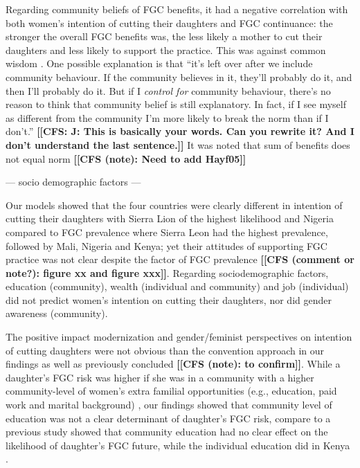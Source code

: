 \documentclass[12pt,]{article}
\newcommand{\comment}[1]{\textbf{[[#1]]}}
\newcommand{\cfcmt}[1]{\comment{CFS: #1}}
\newcommand{\cfonly}[1]{\comment{CFS (note): #1}}
\newcommand{\cf}[1]{\comment{CFS (comment or note?): #1}}
\begin{document}
Regarding community beliefs of FGC benefits, it had a negative correlation with both women’s intention of cutting their daughters and FGC continuance:  the stronger the overall FGC benefits was, the less likely a mother to cut their daughters and less likely to support the practice.  This was against common wisdom \cite{}.  One possible explanation is that “it's left over after we include community behaviour. If the community believes in it, they'll probably do it, and then I'll probably do it. But if I \emph{control for} community behaviour, there's no reason to think that community belief is still explanatory. In fact, if I see myself as different from the community I'm more likely to break the norm than if I don’t.” \cfcmt{J:  This is basically your words.  Can you rewrite it?  And I don’t understand the last sentence.}  It was noted that sum of benefits does not equal norm \cite{RimaLapi15}  \cfonly{Need to add Hayf05}

— socio demographic factors —

Our models showed that the four countries were clearly different in intention of cutting their daughters with Sierra Lion of the highest likelihood and Nigeria compared to FGC prevalence where Sierra Leon had the highest prevalence, followed by Mali, Nigeria and Kenya; yet their attitudes of supporting FGC practice was not clear despite the factor of FGC prevalence \cf{figure xx and figure xxx}.  Regarding sociodemographic factors, education (community), wealth (individual and community) and job (individual) did not predict women’s intention on cutting their daughters, nor did gender awareness (community). 

The positive impact modernization \cite{BoylMcMo02, Youn02} and gender/feminist perspectives \cite{BoylSvec19, DalaLawo10, Dell04, FrieMahm13, KandNwak09, Lewi04, Meye00, Njam04, YirgKass12, Youn02} on intention of cutting daughters were not obvious than the convention approach in our findings as well as previously concluded \cite{Hayf05} \cfonly{to confirm}. While a daughter’s FGC risk was higher if she was in a community with a higher community-level of women’s extra familial opportunities (e.g., education, paid work and marital background) \cite{GrosHayf19}, our findings showed that community level of education was not a clear determinant of daughter’s FGC risk, compare to a previous study showed that community education had no clear effect on the likelihood of daughter’s FGC future, while the individual education did in Kenya \cite{Hayf05}.
\end{document}
